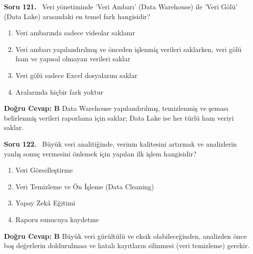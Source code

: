 \documentclass[11pt,a4paper,openany]{book}
\begin{document}
\needspace{5cm}
\vspace{8pt}
\noindent\textbf{\large\sffamily Soru 121.} \ Veri yönetiminde 'Veri Ambarı' (Data Warehouse) ile 'Veri Gölü' (Data Lake) arasındaki en temel fark hangisidir?
\begin{enumerate}[label=\Alph*), leftmargin=25pt, topsep=4pt, itemsep=2pt]
    \item Veri ambarında sadece videolar saklanır
    \item Veri ambarı yapılandırılmış ve önceden işlenmiş verileri saklarken, veri gölü ham ve yapısal olmayan verileri saklar
    \item Veri gölü sadece Excel dosyalarını saklar
    \item Aralarında hiçbir fark yoktur
\end{enumerate}
\vspace{4pt}
\begin{tcolorbox}[title=Cevap ve Açıklama, colback=gray!3!white, colframe=primarycolor!90!black, arc=2mm, fonttitle=\bfseries\sffamily, top=6pt, bottom=6pt]
    \textbf{Doğru Cevap: B}
    \vspace{2pt}
    Data Warehouse yapılandırılmış, temizlenmiş ve şeması belirlenmiş verileri raporlama için saklar; Data Lake ise her türlü ham veriyi saklar.
\end{tcolorbox}
\vspace{10pt}

\needspace{5cm}
\vspace{8pt}
\noindent\textbf{\large\sffamily Soru 122.} \ Büyük veri analitiğinde, verinin kalitesini artırmak ve analizlerin yanlış sonuç vermesini önlemek için yapılan ilk işlem hangisidir?
\begin{enumerate}[label=\Alph*), leftmargin=25pt, topsep=4pt, itemsep=2pt]
    \item Veri Görselleştirme
    \item Veri Temizleme ve Ön İşleme (Data Cleaning)
    \item Yapay Zekâ Eğitimi
    \item Raporu sunucuya kaydetme
\end{enumerate}
\vspace{4pt}
\begin{tcolorbox}[title=Cevap ve Açıklama, colback=gray!3!white, colframe=primarycolor!90!black, arc=2mm, fonttitle=\bfseries\sffamily, top=6pt, bottom=6pt]
    \textbf{Doğru Cevap: B}
    \vspace{2pt}
    Büyük veri gürültülü ve eksik olabileceğinden, analizden önce boş değerlerin doldurulması ve hatalı kayıtların silinmesi (veri temizleme) gerekir.
\end{tcolorbox}
\vspace{10pt}
\end{document}
